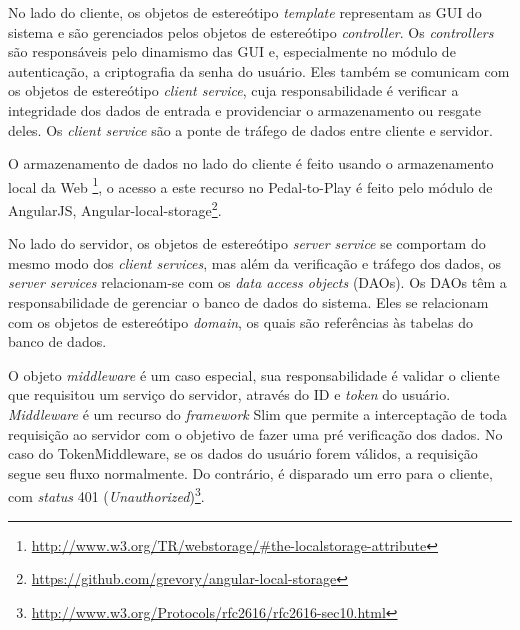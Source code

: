 No lado do cliente, os objetos de estereótipo  \textit{template} representam as GUI do sistema e são gerenciados pelos objetos de estereótipo  \textit{controller}. Os \textit{controllers} são responsáveis pelo dinamismo das GUI e, especialmente no módulo de autenticação, a criptografia da senha do usuário. Eles também se comunicam com os objetos de estereótipo  \textit{client service}, cuja responsabilidade é verificar a integridade dos dados de entrada e providenciar o armazenamento ou resgate deles. Os \textit{client service} são a ponte de tráfego de dados entre cliente e servidor. 
\par
O armazenamento de dados no lado do cliente é feito usando o armazenamento local da Web \footnote{\url{http://www.w3.org/TR/webstorage/\#the-localstorage-attribute}}, o acesso a este recurso no Pedal-to-Play é feito pelo módulo de AngularJS, Angular-local-storage\footnote{\url{https://github.com/grevory/angular-local-storage}}.
\par
No lado do servidor, os objetos de estereótipo  \textit{server service} se comportam do mesmo modo dos \textit{client services}, mas além da verificação e tráfego dos dados, os \textit{server services} relacionam-se com os \textit{data access objects} (DAOs). Os DAOs têm a responsabilidade de gerenciar o banco de dados do sistema. Eles se relacionam com os objetos de estereótipo  \textit{domain}, os quais são referências às tabelas do banco de dados.
\par
O objeto \textit{middleware} é um caso especial, sua responsabilidade é validar o cliente que requisitou um serviço do servidor, através do ID e \textit{token} do usuário. \textit{Middleware} é um recurso do \textit{framework} Slim que permite a interceptação de toda requisição ao servidor com o objetivo de fazer uma pré verificação dos dados. No caso do TokenMiddleware, se os dados do usuário forem válidos, a requisição segue seu fluxo normalmente. Do contrário, é disparado um erro para o cliente, com \textit{status} 401 (\textit{Unauthorized})\footnote{\url{http://www.w3.org/Protocols/rfc2616/rfc2616-sec10.html}}.

